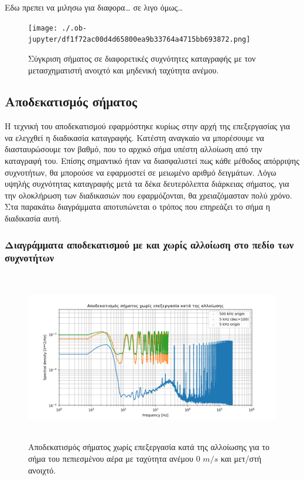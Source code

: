 \documentclass[breaklines=true, 12pt]{article}
\begin{document}
{{{Εδω πρεπει να μιλησω για διαφορα\ldots{} σε λιγο όμως\ldots{}

\begin{figure}[H]
\centering
\texttt{[image: ./.ob-jupyter/df1f72ac00d4d65800ea9b33764a4715bb693872.png]}
\caption{Σύγκριση σήματος σε διαφορετικές συχνότητες καταγραφής με τον μετασχηματιστή ανοιχτό και μηδενική ταχύτητα ανέμου.}
\end{figure}
\subsection{Αποδεκατισμός σήματος}
\label{sec:org0bc9ac2}
\label{sec:decimation-chapter}
Η τεχνική του αποδεκατισμού εφαρμόστηκε κυρίως στην αρχή της επεξεργασίας
για να ελεγχθεί η διαδικασία καταγραφής. Κατέστη αναγκαίο να μπορέσουμε
να διασταυρώσουμε τον βαθμό, που το αρχικό σήμα υπέστη αλλοίωση από την
καταγραφή του. Επίσης σημαντικό ήταν να διασφαλιστεί πως κάθε μέθοδος
απόρριψης συχνοτήτων, θα μπορούσε να εφαρμοστεί σε μειωμένο αριθμό
δειγμάτων. Λόγω υψηλής συχνότητας καταγραφής μετά τα δέκα δευτερόλεπτα
διάρκειας σήματος, για την ολοκλήρωση των διαδικασιών που εφαρμόζονται, θα
χρειαζόμασταν πολύ χρόνο. Στα παρακάτω διαγράμματα αποτυπώνεται ο τρόπος
που επηρεάζει το σήμα η διαδικασία αυτή.
\subsubsection{\textbf{Διαγράμματα αποδεκατισμού με και χωρίς αλλοίωση στο πεδίο των συχνοτήτων}}
\label{sec:orge538b1d}
\begin{figure}[htbp]
\centering
\includegraphics[width=500px,height=280px]{./decimation/with_aliasing.png}
\caption{\label{fig:with_al}Αποδεκατισμός σήματος χωρίς επεξεργασία κατά της αλλοίωσης για το σήμα του πεπιεσμένου αέρα με ταχύτητα ανέμου 0 \(m/s\) και μετ/στή ανοιχτό.}
\end{figure}

}}}
\end{document}
